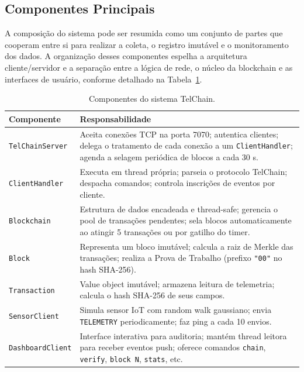 \documentclass[12pt, a4paper]{article}
\begin{document}
\subsection{Componentes Principais}

A composição do sistema pode ser resumida como um conjunto de partes que 
cooperam entre si para realizar a coleta, o registro imutável e o monitoramento dos 
dados. A organização desses componentes espelha a arquitetura cliente/servidor e a 
separação entre a lógica de rede, o núcleo da blockchain e as interfaces de usuário, 
conforme detalhado na Tabela~\ref{tab:components}.

\begin{table}[H]
\centering
\caption{Componentes do sistema TelChain.}
\label{tab:components}
\begin{tabularx}{\linewidth}{lX}
\toprule
\textbf{Componente} & \textbf{Responsabilidade} \\
\midrule
\texttt{TelChainServer}  & Aceita conexões TCP na porta 7070; autentica clientes; delega o tratamento de cada conexão a um \texttt{ClientHandler}; agenda a selagem periódica de blocos a cada 30 s. \\
\addlinespace
\texttt{ClientHandler}   & Executa em thread própria; parseia o protocolo TelChain; despacha comandos; controla inscrições de eventos por cliente. \\
\addlinespace
\texttt{Blockchain}      & Estrutura de dados encadeada e thread-safe; gerencia o pool de transações pendentes; sela blocos automaticamente ao atingir 5 transações ou por gatilho do timer. \\
\addlinespace
\texttt{Block}           & Representa um bloco imutável; calcula a raiz de Merkle das transações; realiza a Prova de Trabalho (prefixo \texttt{"00"} no hash SHA-256). \\
\addlinespace
\texttt{Transaction}     & Value object imutável; armazena leitura de telemetria; calcula o hash SHA-256 de seus campos. \\
\addlinespace
\texttt{SensorClient}    & Simula sensor IoT com random walk gaussiano; envia \texttt{TELEMETRY} periodicamente; faz ping a cada 10 envios. \\
\addlinespace
\texttt{DashboardClient} & Interface interativa para auditoria; mantém thread leitora para receber eventos push; oferece comandos \texttt{chain}, \texttt{verify}, \texttt{block N}, \texttt{stats}, etc. \\
\bottomrule
\end{tabularx}
\end{table}
\end{document}
